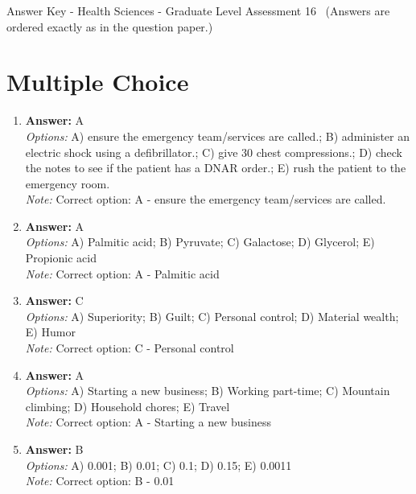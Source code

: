 \documentclass[12pt]{article}
\begin{document}
\begin{center}
Answer Key - Health Sciences - Graduate Level Assessment 16 \
\small (Answers are ordered exactly as in the question paper.)
\end{center}

\section*{Multiple Choice}
\begin{enumerate}[label=\arabic*.]
\item \textbf{Answer:} A
\\ \textit{Options:} A) ensure the emergency team/services are called.; B) administer an electric shock using a defibrillator.; C) give 30 chest compressions.; D) check the notes to see if the patient has a DNAR order.; E) rush the patient to the emergency room.
\\ \textit{Note:} Correct option: A - ensure the emergency team/services are called.
\item \textbf{Answer:} A
\\ \textit{Options:} A) Palmitic acid; B) Pyruvate; C) Galactose; D) Glycerol; E) Propionic acid
\\ \textit{Note:} Correct option: A - Palmitic acid
\item \textbf{Answer:} C
\\ \textit{Options:} A) Superiority; B) Guilt; C) Personal control; D) Material wealth; E) Humor
\\ \textit{Note:} Correct option: C - Personal control
\item \textbf{Answer:} A
\\ \textit{Options:} A) Starting a new business; B) Working part-time; C) Mountain climbing; D) Household chores; E) Travel
\\ \textit{Note:} Correct option: A - Starting a new business
\item \textbf{Answer:} B
\\ \textit{Options:} A) 0.001; B) 0.01; C) 0.1; D) 0.15; E) 0.0011
\\ \textit{Note:} Correct option: B - 0.01
\end{enumerate}
\end{document}
